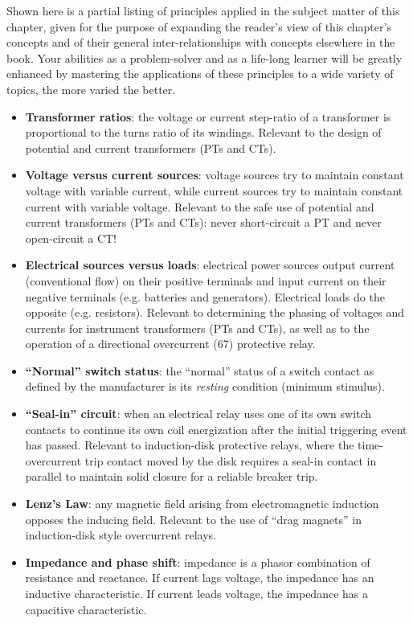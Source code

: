 Shown here is a partial listing of principles applied in the subject matter of this chapter, given for the purpose of expanding the reader's view of this chapter's concepts and of their general inter-relationships with concepts elsewhere in the book.  Your abilities as a problem-solver and as a life-long learner will be greatly enhanced by mastering the applications of these principles to a wide variety of topics, the more varied the better.

\begin{itemize}
\item \textbf{Transformer ratios}: the voltage or current step-ratio of a transformer is proportional to the turns ratio of its windings.  Relevant to the design of potential and current transformers (PTs and CTs).
\item \textbf{Voltage versus current sources}: voltage sources try to maintain constant voltage with variable current, while current sources try to maintain constant current with variable voltage.  Relevant to the safe use of potential and current transformers (PTs and CTs): never short-circuit a PT and never open-circuit a CT!
\item \textbf{Electrical sources versus loads}: electrical power sources output current (conventional flow) on their positive terminals and input current on their negative terminals (e.g. batteries and generators).  Electrical loads do the opposite (e.g. resistors).  Relevant to determining the phasing of voltages and currents for instrument transformers (PTs and CTs), as well as to the operation of a directional overcurrent (67) protective relay.
\item \textbf{``Normal'' switch status}: the ``normal'' status of a switch contact as defined by the manufacturer is its \textit{resting} condition (minimum stimulus).
\item \textbf{``Seal-in'' circuit}: when an electrical relay uses one of its own switch contacts to continue its own coil energization after the initial triggering event has passed.  Relevant to induction-disk protective relays, where the time-overcurrent trip contact moved by the disk requires a seal-in contact in parallel to maintain solid closure for a reliable breaker trip.
\item \textbf{Lenz's Law}: any magnetic field arising from electromagnetic induction opposes the inducing field.  Relevant to the use of ``drag magnets'' in induction-disk style overcurrent relays.
\item \textbf{Impedance and phase shift}: impedance is a phasor combination of resistance and reactance.  If current lags voltage, the impedance has an inductive characteristic.  If current leads voltage, the impedance has a capacitive characteristic.
\end{itemize}






